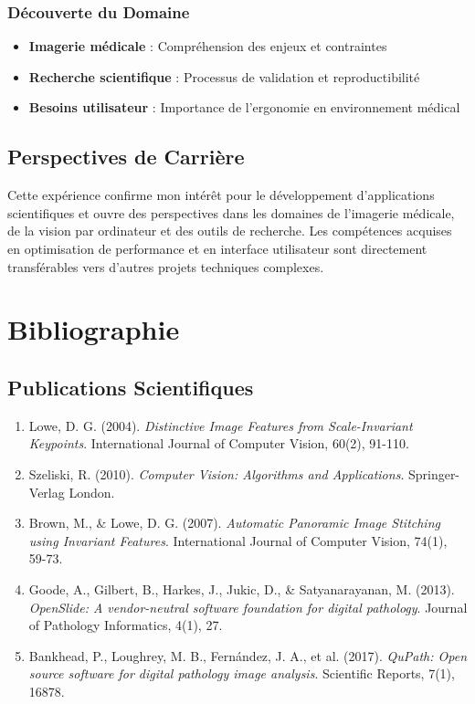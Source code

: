 \documentclass[12pt,a4paper]{article}
\begin{document}
\subsubsection{Découverte du Domaine}

\begin{itemize}
\item \textbf{Imagerie médicale} : Compréhension des enjeux et contraintes
\item \textbf{Recherche scientifique} : Processus de validation et reproductibilité
\item \textbf{Besoins utilisateur} : Importance de l'ergonomie en environnement médical
\end{itemize}

\subsection{Perspectives de Carrière}

Cette expérience confirme mon intérêt pour le développement d'applications scientifiques et ouvre des perspectives dans les domaines de l'imagerie médicale, de la vision par ordinateur et des outils de recherche. Les compétences acquises en optimisation de performance et en interface utilisateur sont directement transférables vers d'autres projets techniques complexes.

\newpage

\section{Bibliographie}

\subsection{Publications Scientifiques}

\begin{enumerate}
\item Lowe, D. G. (2004). \textit{Distinctive Image Features from Scale-Invariant Keypoints}. International Journal of Computer Vision, 60(2), 91-110.

\item Szeliski, R. (2010). \textit{Computer Vision: Algorithms and Applications}. Springer-Verlag London.

\item Brown, M., \& Lowe, D. G. (2007). \textit{Automatic Panoramic Image Stitching using Invariant Features}. International Journal of Computer Vision, 74(1), 59-73.

\item Goode, A., Gilbert, B., Harkes, J., Jukic, D., \& Satyanarayanan, M. (2013). \textit{OpenSlide: A vendor-neutral software foundation for digital pathology}. Journal of Pathology Informatics, 4(1), 27.

\item Bankhead, P., Loughrey, M. B., Fernández, J. A., et al. (2017). \textit{QuPath: Open source software for digital pathology image analysis}. Scientific Reports, 7(1), 16878.
\end{enumerate}
\end{document}
